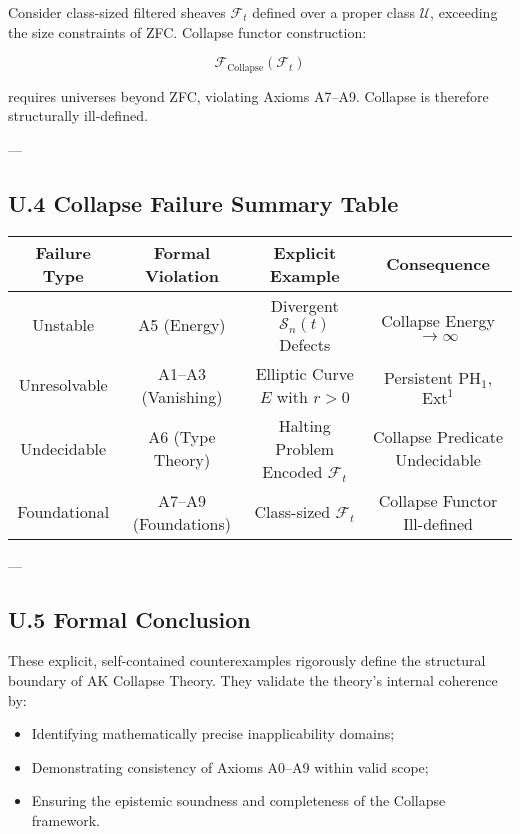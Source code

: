 \documentclass[11pt]{article}
\begin{document}
Consider class-sized filtered sheaves $\mathcal{F}_t$ defined over a proper class $\mathcal{U}$, exceeding the size constraints of ZFC.  
Collapse functor construction:

\[
\mathcal{F}_{\mathrm{Collapse}}(\mathcal{F}_t)
\]

requires universes beyond ZFC, violating Axioms A7–A9.  
Collapse is therefore structurally ill-defined.

---

\subsection*{U.4 Collapse Failure Summary Table}

\begin{center}
\begin{tabular}{|c|c|c|c|}
\hline
\textbf{Failure Type} & \textbf{Formal Violation} & \textbf{Explicit Example} & \textbf{Consequence} \\
\hline
Unstable & A5 (Energy) & Divergent $\mathcal{S}_n(t)$ Defects & Collapse Energy $\to \infty$ \\
Unresolvable & A1–A3 (Vanishing) & Elliptic Curve $E$ with $r>0$ & Persistent $\mathrm{PH}_1$, $\mathrm{Ext}^1$ \\
Undecidable & A6 (Type Theory) & Halting Problem Encoded $\mathcal{F}_t$ & Collapse Predicate Undecidable \\
Foundational & A7–A9 (Foundations) & Class-sized $\mathcal{F}_t$ & Collapse Functor Ill-defined \\
\hline
\end{tabular}
\end{center}

---

\subsection*{U.5 Formal Conclusion}

These explicit, self-contained counterexamples rigorously define the structural boundary of AK Collapse Theory.  
They validate the theory's internal coherence by:

\begin{itemize}
    \item Identifying mathematically precise inapplicability domains;
    \item Demonstrating consistency of Axioms A0–A9 within valid scope;
    \item Ensuring the epistemic soundness and completeness of the Collapse framework.
\end{itemize}
\end{document}
